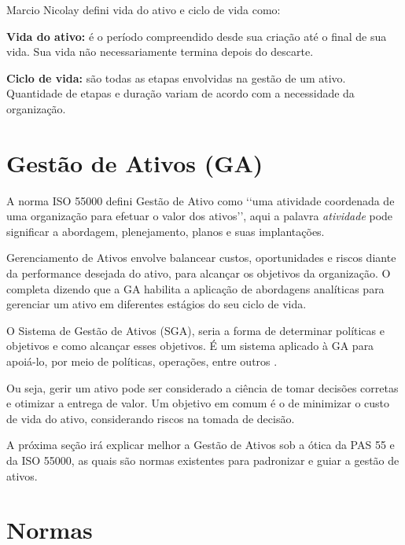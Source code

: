 Marcio Nicolay \cite{nicolay2015} defini vida do ativo e ciclo de vida como:

\textbf{Vida do ativo:} é o período compreendido desde sua criação até o final de sua vida. Sua vida não necessariamente termina depois do descarte.

\textbf{Ciclo de vida:} são todas as etapas envolvidas na gestão de um ativo. Quantidade de etapas e duração variam de acordo com a necessidade da organização.


\section{Gestão de Ativos (GA)}

A norma ISO 55000 defini Gestão de Ativo como \lq\lq uma atividade coordenada de uma organização para efetuar o valor dos ativos\rq\rq, aqui a palavra \emph{atividade} pode significar a abordagem, plenejamento, planos e suas implantações. 

Gerenciamento de Ativos envolve balancear custos, oportunidades e riscos diante da performance desejada do ativo, para alcançar os objetivos da organização. O \cite{iam} completa dizendo que a GA habilita a aplicação de abordagens analíticas para gerenciar um ativo em diferentes estágios do seu ciclo de vida.

O Sistema de Gestão de Ativos (SGA), seria a forma de determinar políticas e objetivos e como alcançar esses objetivos. É um sistema aplicado à GA para apoiá-lo, por meio de políticas, operações, entre outros \cite{abraman}. 

Ou seja, gerir um ativo pode ser considerado a ciência de tomar decisões corretas e otimizar a entrega de valor. Um objetivo em comum é o de minimizar o custo de vida do ativo, considerando riscos na tomada de decisão.

A próxima seção irá explicar melhor a Gestão de Ativos sob a ótica da PAS 55 e da ISO 55000, as quais são normas existentes para padronizar e guiar a gestão de ativos.


\section{Normas}
\label{normas}

